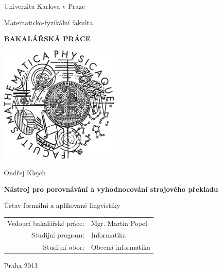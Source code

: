 \documentclass[12pt,a4paper]{report}
\begin{document}


\pagestyle{empty}
\begin{center}

\large

Univerzita Karlova v Praze

\medskip

Matematicko-fyzikální fakulta

\vfill

{\bf\Large BAKALÁŘSKÁ PRÁCE}

\vfill

\centerline{\mbox{\includegraphics[width=60mm]{img/logo.eps}}}

\vfill
\vspace{5mm}

{\LARGE Ondřej Klejch}

\vspace{15mm}

{\LARGE\bfseries Nástroj pro porovnávání a vyhodnocování strojového překladu}

\vfill

Ústav formální a aplikované lingvistiky

\vfill

\begin{tabular}{rl}

Vedoucí bakalářské práce: & Mgr. Martin Popel \\
\noalign{\vspace{2mm}}
Studijní program: & Informatika  \\
\noalign{\vspace{2mm}}
Studijní obor: & Obecná informatika \\
\end{tabular}

\vfill

Praha 2013

\end{center}
\end{document}
